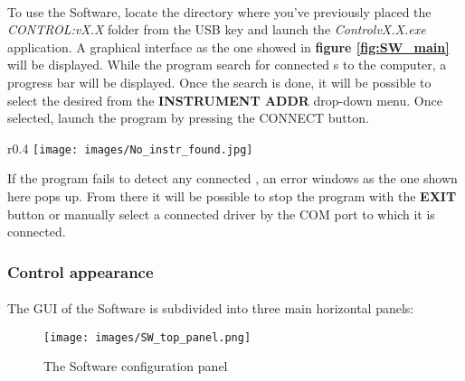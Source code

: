 \paragraph{} To use the \SoftwareType Software, locate the directory where you've previously placed the \textit{\QubeModel \textunderscore CONTROL:vX.X} folder from the USB key and launch the \textit{\QubeModel \textunderscore Control\textunderscore vX.X.exe} application.
\newline    
A graphical interface as the one showed in \textbf{figure \ref{fig:SW_main}} will be displayed. While the program search for connected \QubeModel s to the computer, a progress bar will be displayed. Once the search is done, it will be possible to select the desired \QubeModel  from the \textbf{INSTRUMENT ADDR} drop-down menu. Once selected, launch the program by pressing the CONNECT button.
\begin{wrapfigure}{r}{0.4\textwidth}
    \centering
    \texttt{[image: images/No\_instr\_found.jpg]}
\end{wrapfigure}
\newline If the program fails to detect any connected \QubeModel , an error windows as the one shown here pops up. From there it will be possible to stop the program with the \textbf{EXIT} button or manually select a connected driver by the COM port to which it is connected.





\subsubsection{\QubeModel \textunderscore Control appearance}

\paragraph{} The GUI of the \SoftwareType Software is subdivided into three main horizontal panels:

    \begin{figure}[h]
        \centering
        \texttt{[image: images/SW\_top\_panel.png]}
        \caption{The \SoftwareType Software configuration panel}
        \label{fig:sw_top_panel}
    \end{figure}
    
